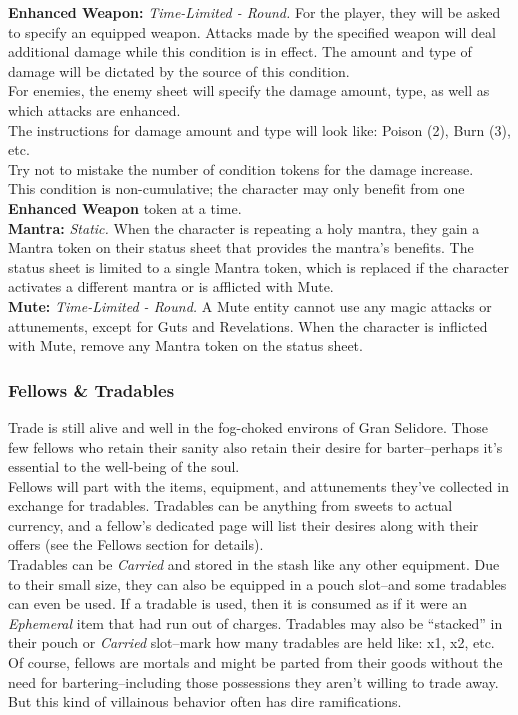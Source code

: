 \documentclass[12pt]{article}
\begin{document}
\begin{multicols*}{2}
\textbf{Enhanced Weapon:} \emph{Time-Limited - Round.} For the player, they will be asked to specify an equipped weapon. Attacks made by the specified weapon will deal additional damage while this condition is in effect. The amount and type of damage will be dictated by the source of this condition.\\
For enemies, the enemy sheet will specify the damage amount, type, as well as which attacks are enhanced.\\
The instructions for damage amount and type will look like: Poison (2), Burn (3), etc.\\
Try not to mistake the number of condition tokens for the damage increase.\\
This condition is non-cumulative; the character may only benefit from one \textbf{Enhanced Weapon} token at a time.\\

\textbf{Mantra:} \emph{Static.} When the character is repeating a holy mantra, they gain a Mantra token on their status sheet that provides the mantra’s benefits. The status sheet is limited to a single Mantra token, which is replaced if the character activates a different mantra or is afflicted with Mute.\\

\textbf{Mute:} \emph{Time-Limited - Round.} A Mute entity cannot use any magic attacks or attunements, except for Guts and Revelations. When the character is inflicted with Mute, remove any Mantra token on the status sheet.

\subsubsection{Fellows \& Tradables}
Trade is still alive and well in the fog-choked environs of Gran Selidore. Those few fellows who retain their sanity also retain their desire for barter--perhaps it’s essential to the well-being of the soul.\\
Fellows will part with the items, equipment, and attunements they’ve collected in exchange for tradables. Tradables can be anything from sweets to actual currency, and a fellow’s dedicated page will list their desires along with their offers (see the Fellows section for details).\\
Tradables can be \emph{Carried} and stored in the stash like any other equipment. Due to their small size, they can also be equipped in a pouch slot--and some tradables can even be used. If a tradable is used, then it is consumed as if it were an \emph{Ephemeral} item that had run out of charges. Tradables may also be “stacked” in their pouch or \emph{Carried} slot--mark how many tradables are held like: x1, x2, etc.\\
Of course, fellows are mortals and might be parted from their goods without the need for bartering--including those possessions they aren’t willing to trade away. But this kind of villainous behavior often has dire ramifications.


\end{multicols*}
\end{document}
